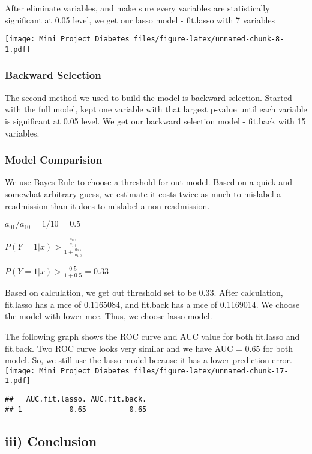 \documentclass[]{article}
\begin{document}
After eliminate variables, and make sure every variables are
statistically significant at 0.05 level, we get our lasso model -
fit.lasso with 7 variables

\texttt{[image: Mini\_Project\_Diabetes\_files/figure-latex/unnamed-chunk-8-1.pdf]}

\subsubsection{Backward Selection}\label{backward-selection}

The second method we used to build the model is backward selection.
Started with the full model, kept one variable with that largest p-value
until each variable is significant at 0.05 level. We get our backward
selection model - fit.back with 15 variables.

\subsubsection{Model Comparision}\label{model-comparision}

We use Bayes Rule to choose a threshold for out model. Based on a quick
and somewhat arbitrary guess, we estimate it costs twice as much to
mislabel a readmission than it does to mislabel a non-readmission.

\(a_{01}/a_{10}=1/10=0.5\)

\(P(Y=1 \vert x) > \frac{\frac{a_{0,1}}{a_{1,0}}}{1 + \frac{a_{0,1}}{a_{1,0}}}\)

\(P(Y=1 \vert x) > \frac{0.5}{1 + 0.5}=0.33\)

Based on calculation, we get out threshold set to be 0.33. After
calculation, fit.lasso has a mce of 0.1165084, and fit.back has a mce of
0.1169014. We choose the model with lower mce. Thus, we choose lasso
model.

The following graph shows the ROC curve and AUC value for both fit.lasso
and fit.back. Two ROC curve looks very similar and we have AUC = 0.65
for both model. So, we still use the lasso model because it has a lower
prediction error.
\texttt{[image: Mini\_Project\_Diabetes\_files/figure-latex/unnamed-chunk-17-1.pdf]}

\begin{verbatim}
##   AUC.fit.lasso. AUC.fit.back.
## 1           0.65          0.65
\end{verbatim}

\subsection{iii) Conclusion}\label{iii-conclusion}
\end{document}
